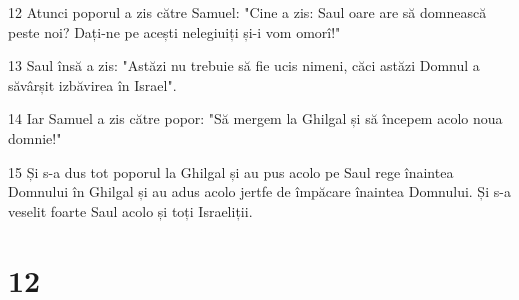 \par 12 Atunci poporul a zis către Samuel: "Cine a zis: Saul oare are să domnească peste noi? Dați-ne pe acești nelegiuiți și-i vom omorî!"
\par 13 Saul însă a zis: "Astăzi nu trebuie să fie ucis nimeni, căci astăzi Domnul a săvârșit izbăvirea în Israel".
\par 14 Iar Samuel a zis către popor: "Să mergem la Ghilgal și să începem acolo noua domnie!"
\par 15 Și s-a dus tot poporul la Ghilgal și au pus acolo pe Saul rege înaintea Domnului în Ghilgal și au adus acolo jertfe de împăcare înaintea Domnului. Și s-a veselit foarte Saul acolo și toți Israeliții.

\chapter{12}

